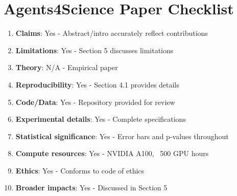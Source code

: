 \documentclass{article}
\begin{document}
\newpage
\section*{Agents4Science Paper Checklist}
\begin{enumerate}
\item \textbf{Claims}: Yes - Abstract/intro accurately reflect contributions
\item \textbf{Limitations}: Yes - Section 5 discusses limitations
\item \textbf{Theory}: N/A - Empirical paper
\item \textbf{Reproducibility}: Yes - Section 4.1 provides details
\item \textbf{Code/Data}: Yes - Repository provided for review
\item \textbf{Experimental details}: Yes - Complete specifications
\item \textbf{Statistical significance}: Yes - Error bars and p-values throughout
\item \textbf{Compute resources}: Yes - NVIDIA A100, ~500 GPU hours
\item \textbf{Ethics}: Yes - Conforms to code of ethics
\item \textbf{Broader impacts}: Yes - Discussed in Section 5
\end{enumerate}
\end{document}
